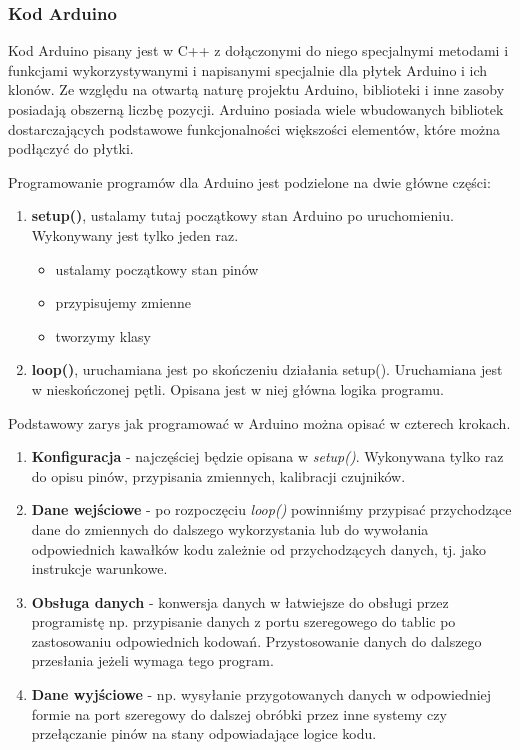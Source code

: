 \documentclass[a4paper,12pt, twoside]{article}
\begin{document}
    	\vspace{1cm}
    	\subsubsection{Kod Arduino}
    	Kod Arduino pisany jest w C++ z dołączonymi do niego specjalnymi metodami i funkcjami wykorzystywanymi i napisanymi specjalnie dla płytek Arduino i ich klonów. Ze względu na otwartą naturę projektu Arduino, biblioteki i inne zasoby posiadają obszerną liczbę pozycji. Arduino posiada wiele wbudowanych bibliotek dostarczających podstawowe funkcjonalności większości elementów, które można podłączyć do płytki. 
    	
    	\begin{flushleft}
    	\vspace{.5cm}Programowanie programów dla Arduino jest podzielone na dwie główne części:
    	\begin{enumerate}
    	    \item  
    	    \textbf{setup()}, ustalamy tutaj początkowy stan Arduino po uruchomieniu. Wykonywany jest tylko jeden raz.	
    	    \begin{itemize}
    	        \item ustalamy początkowy stan pinów
    	        \item przypisujemy zmienne
    	        \item tworzymy klasy
        	\end{itemize}
        	\item  
    	    \textbf{loop()}, uruchamiana jest po skończeniu działania setup(). Uruchamiana jest w nieskończonej pętli. Opisana jest w niej główna logika programu.
    	\end{enumerate}
    	
    	\flushleft\vspace{.5cm}Podstawowy zarys jak programować w Arduino można opisać w czterech krokach.\cite{stepsarduino} 
    	
    	
    	\begin{enumerate}
    	    \item \textbf{Konfiguracja} - najczęściej będzie opisana w \textit{setup()}. Wykonywana tylko raz do opisu pinów, przypisania zmiennych, kalibracji czujników.
    	    \item \textbf{Dane wejściowe} - po rozpoczęciu \textit{loop()} powinniśmy przypisać przychodzące dane do zmiennych do dalszego wykorzystania lub do wywołania odpowiednich kawałków kodu zależnie od przychodzących danych, tj. jako instrukcje warunkowe.  
    	    \item \textbf{Obsługa danych} - konwersja danych w łatwiejsze do obsługi przez programistę np. przypisanie danych z portu szeregowego do tablic po zastosowaniu odpowiednich kodowań. Przystosowanie danych do dalszego przesłania jeżeli wymaga tego program.
    	    \item \textbf{Dane wyjściowe} - np. wysyłanie przygotowanych danych w odpowiedniej formie na port szeregowy do dalszej obróbki przez inne systemy czy przełączanie pinów na stany odpowiadające logice kodu.
    	\end{enumerate}
    	\end{flushleft}
    	
\end{document}
